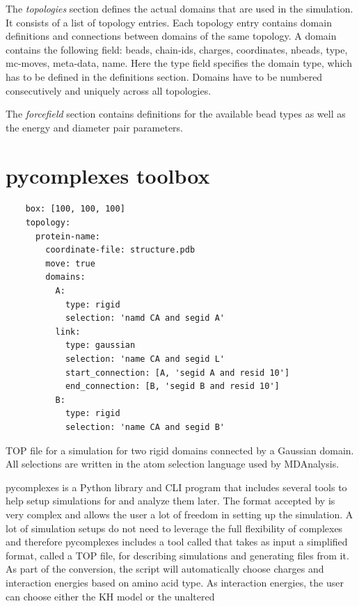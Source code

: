 \documentclass[12pt, twoside]{report}
\begin{document}
The \textit{topologies} section defines the actual domains that are used in the
simulation. It consists of a \yaml list of topology entries. Each topology entry
contains domain definitions and connections between domains of the same
topology. A domain contains the following field: beads, chain-ids, charges,
coordinates, nbeads, type, mc-moves, meta-data, name. Here the type field
specifies the domain type, which has to be defined in the definitions section.
Domains have to be numbered consecutively and uniquely across all topologies.

The \textit{forcefield} section contains definitions for the available bead
types as well as the energy and diameter pair parameters.

\chapter{pycomplexes toolbox}
\begin{listing}[!ht]
  \begin{verbatim}
    box: [100, 100, 100]
    topology:
      protein-name:
        coordinate-file: structure.pdb
        move: true
        domains:
          A:
            type: rigid
            selection: 'namd CA and segid A'
          link:
            type: gaussian
            selection: 'name CA and segid L'
            start_connection: [A, 'segid A and resid 10']
            end_connection: [B, 'segid B and resid 10']
          B:
            type: rigid
            selection: 'name CA and segid B'
\end{verbatim}
\caption{TOP file for a simulation for two rigid domains connected by a Gaussian
domain. All selections are written in the atom selection language used by
MDAnalysis.}
\label{listing:top-definitions}
\end{listing} pycomplexes is a \mbox{Python} library and \gls{CLI} program that
includes several tools to help setup simulations for \complexes and analyze them
later. The \cplx format accepted by \complexes is very complex and allows the
user a lot of freedom in setting up the simulation. A lot of simulation setups
do not need to leverage the full flexibility of complexes and therefore
pycomplexes includes a tool called  that takes as input a
simplified format, called a TOP file, for describing simulations and generating
\cplx files from it. As part of the conversion, the script will automatically
choose charges and interaction energies based on amino acid type. As interaction
energies, the user can choose either the \gls{KH} model or the unaltered
\end{document}
